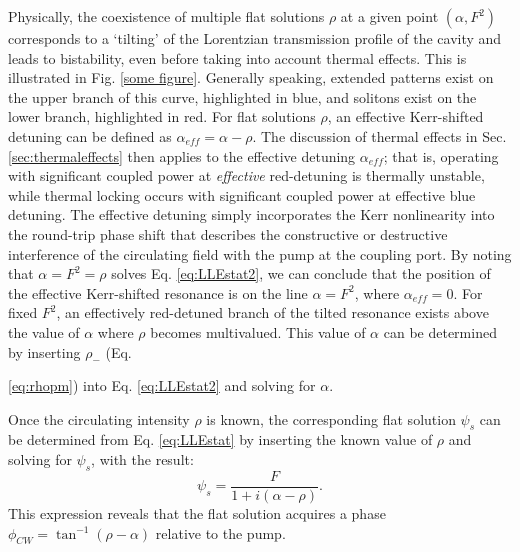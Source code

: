 Physically, the coexistence of multiple flat solutions $\rho$ at a given point $(\alpha,F^2)$ corresponds to a `tilting' of the Lorentzian transmission profile of the cavity and leads to bistability, even before taking into account thermal effects. This is illustrated in Fig. \ref{some figure}. Generally speaking, extended patterns exist on the upper branch of this curve, highlighted in blue, and solitons exist on the lower branch, highlighted in red. For flat solutions $\rho$, an effective Kerr-shifted detuning can be defined as $\alpha_{eff}=\alpha-\rho$. The discussion of thermal effects in Sec. \ref{sec:thermaleffects} then applies to the effective detuning $\alpha_{eff}$; that is, operating with significant coupled power at \textit{effective} red-detuning is thermally unstable, while thermal locking occurs with significant coupled power at effective blue detuning. The effective detuning simply incorporates the Kerr nonlinearity into the round-trip phase shift that describes the constructive or destructive interference of the circulating field with the pump at the coupling port. By noting that $\alpha=F^2=\rho$ solves Eq. \ref{eq:LLEstat2}, we can conclude that the position of the effective Kerr-shifted resonance is on the line $\alpha=F^2$, where $\alpha_{eff}=0$. For fixed $F^2$, an effectively red-detuned branch of the tilted resonance exists above the value of $\alpha$ where $\rho$ becomes multivalued. This value of $\alpha$ can be determined by inserting $\rho_-$ (Eq. {\ref{eq:rhopm}) into Eq. \ref{eq:LLEstat2} and solving for $\alpha$. 

Once the circulating intensity $\rho$ is known, the corresponding flat solution $\psi_s$ can be determined from Eq. \ref{eq:LLEstat} by inserting the known value of $\rho$ and solving for $\psi_s$, with the result:
\begin{equation}
\psi_s=\frac{F}{1+i(\alpha-\rho)}.\label{eq:LLEflatsoln}
\end{equation}
This expression reveals that the flat solution acquires a phase $\phi_{CW}=\tan^{-1}(\rho-\alpha)$ relative to the pump.



}
